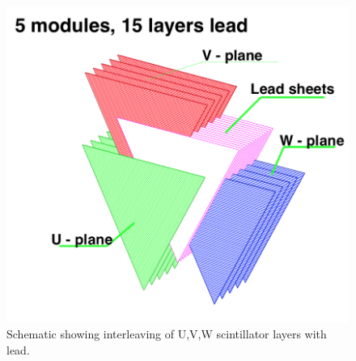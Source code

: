 \begin{figure}
\centering
\includegraphics[scale=0.35]{images/pcal_layers.png}
\caption[PCAL UVW Layers]{Schematic showing interleaving of U,V,W scintillator layers with lead. }
\label{pcal-layers}
\end{figure}